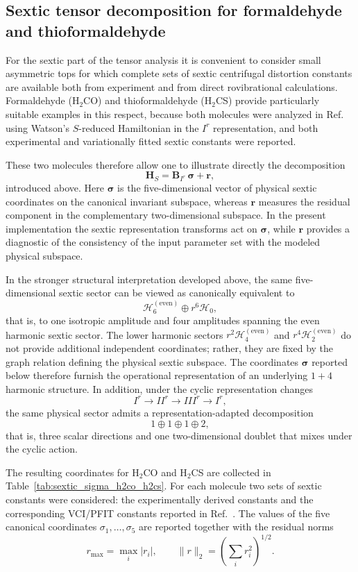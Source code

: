 \subsection{Sextic tensor decomposition for formaldehyde and thioformaldehyde}

For the sextic part of the tensor analysis it is convenient to consider
small asymmetric tops for which complete sets of sextic centrifugal
distortion constants are available both from experiment and from direct
rovibrational calculations.  Formaldehyde (H$_2$CO) and thioformaldehyde
(H$_2$CS) provide particularly suitable examples in this respect, because
both molecules were analyzed in Ref.~ using Watson's
$S$-reduced Hamiltonian in the $I^r$ representation, and both experimental
and variationally fitted sextic constants were reported.

These two molecules therefore allow one to illustrate directly the
decomposition
\[
\mathbf H_S = \mathbf B_{I^r}\,\boldsymbol\sigma + \mathbf r,
\]
introduced above.  Here $\boldsymbol\sigma$ is the five-dimensional vector
of physical sextic coordinates on the canonical invariant subspace, whereas
$\mathbf r$ measures the residual component in the complementary
two-dimensional subspace.  In the present implementation the sextic
representation transforms act on $\boldsymbol\sigma$, while $\mathbf r$
provides a diagnostic of the consistency of the input parameter set with the
modeled physical subspace.

In the stronger structural interpretation developed above, the same
five-dimensional sextic sector can be viewed as canonically equivalent to
\[
\mathcal H_6^{(\mathrm{even})}\oplus r^6\mathcal H_0,
\]
that is, to one isotropic amplitude and four amplitudes spanning the even
harmonic sextic sector.  The lower harmonic sectors
$r^2\mathcal H_4^{(\mathrm{even})}$ and
$r^4\mathcal H_2^{(\mathrm{even})}$ do not provide additional independent
coordinates; rather, they are fixed by the graph relation defining the
physical sextic subspace.  The coordinates $\boldsymbol\sigma$ reported below
therefore furnish the operational representation of an underlying $1+4$
harmonic structure.  In addition, under the cyclic representation changes
\[
I^r \rightarrow II^r \rightarrow III^r \rightarrow I^r,
\]
the same physical sector admits a representation-adapted decomposition
\[
1\oplus 1\oplus 1\oplus 2,
\]
that is, three scalar directions and one two-dimensional doublet that mixes
under the cyclic action.

The resulting coordinates for H$_2$CO and H$_2$CS are collected in
Table~\ref{tab:sextic_sigma_h2co_h2cs}.  For each molecule two sets of
sextic constants were considered: the experimentally derived constants and
the corresponding VCI/PFIT constants reported in Ref.~.
The values of the five canonical coordinates $\sigma_1,\ldots,\sigma_5$ are
reported together with the residual norms
\[
r_{\max}=\max_i |r_i|,
\qquad
\|r\|_2 = \left(\sum_i r_i^2\right)^{1/2}.
\]

